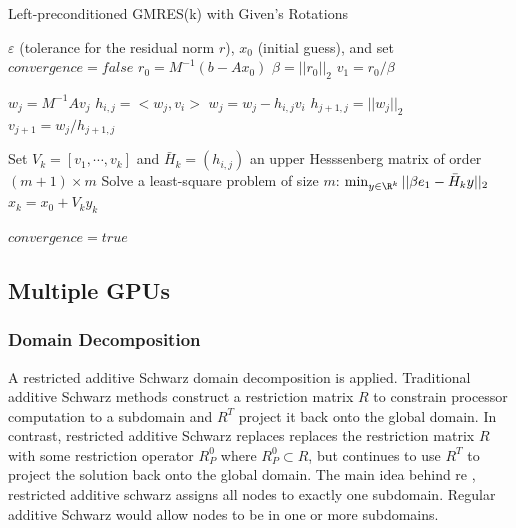 \begin{algorithm}                      %
\caption{Left-preconditioned GMRES(k) with Given's Rotations}          %
\label{alg:gmres}                           %
\begin{algorithmic}[1]                    %
    \State $\varepsilon$ (tolerance for the residual norm $r$), $x_0$ (initial guess), and set $convergence = false$
    \State $r_0 = M^{-1} (b-Ax_0)$
    \State $\beta = ||r_0||_2$			
    \State $v_1 = r_0 / \beta$ 

	 \label{alg:gmres_rotation_loop_start} 
			\State $w_j = M^{-1} A v_j$   
			\label{alg:gmres_inner_loop_start}
				\State $h_{i,j} = <w_j, v_i>$ 
				\State $w_j = w_j - h_{i,j} v_i$
			\EndFor \label{alg:gmres_inner_loop_stop}
			\State $h_{j+1, j}  = ||w_j||_2$		
			\State $v_{j+1} = w_j / h_{j+1,j}$		
	\EndFor\label{alg:gmres_rotation_loop_stop} 

			\State Set $V_k = [v_1, \cdots, v_k]$ and $\bar{H}_k = (h_{i,j})$ an upper Hesssenberg matrix of order $(m+1)\times m$
			\State \label{alg:gmres_least_squares} Solve a least-square problem of size $m$: $\min_{y \in \R^k} ||\beta e_1 - \bar{H}_k y||_2$	
			\State $x_k = x_0 + V_k y_k$ \label{alg:gmes_residual_norm}

		\State $convergence = true$
	\EndIf
    \EndWhile
\end{algorithmic}
\end{algorithm}

\subsection{Multiple GPUs}
\subsubsection{Domain Decomposition} 
A restricted additive Schwarz \cite{Cai1998} domain decomposition is applied. Traditional additive Schwarz methods construct a restriction matrix $R$ to constrain processor computation to a subdomain and $R^T$ project it back onto the global domain. In contrast, restricted additive Schwarz replaces replaces the restriction matrix $R$ with some restriction operator $R^0_P$ where $R^0_P \subset R$, but continues to use $R^T$ to project the solution back onto the global domain. The main idea behind re
, restricted additive schwarz assigns all nodes to exactly one subdomain. Regular additive Schwarz would allow nodes to be in one or more subdomains.
 
